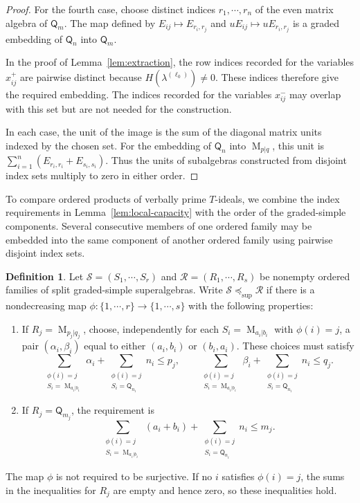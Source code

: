 \documentclass[11pt,reqno]{amsart}
\newcommand{\Mat}{\operatorname{M}}
\newcommand{\Qtype}{\mathsf Q}
\theoremstyle{definition}
\newtheorem{definition}[theorem]{Definition}
\theoremstyle{remark}
\numberwithin{equation}{section}
\begin{document}
\begin{proof}
For the fourth case, choose distinct indices
$r_1,\cdots,r_n$ of the even matrix algebra
of $\Qtype_m$. The map defined by $
E_{ij}\longmapsto E_{r_i,r_j}$ and $
uE_{ij}\longmapsto uE_{r_i,r_j}$
is a graded embedding of $\Qtype_n$
into $\Qtype_m$.

In the proof of Lemma~\ref{lem:extraction},
the row indices recorded for the variables $x^+_{ij}$
are pairwise distinct because
$H(\lambda^{(\ell_0)})\ne0$.
These indices therefore give the required embedding.
The indices recorded for the variables $x^-_{ij}$
may overlap with this set but are not needed
for the construction.

In each case, the unit of the image is the sum
of the diagonal matrix units indexed by the
chosen set.
For the embedding of $\Qtype_n$ into $\Mat_{p|q}$,
this unit is $
\sum_{i=1}^n
(E_{r_i,r_i}+E_{s_i,s_i})$.
Thus the units of subalgebras constructed from
disjoint index sets multiply to zero in either
order.
\end{proof}

To compare ordered products of verbally prime $T$-ideals,
we combine the index requirements in
Lemma~\ref{lem:local-capacity} with the order of the
graded-simple components.
Several consecutive members of one ordered family
may be embedded into the same component of another
ordered family using pairwise disjoint index sets.

\begin{definition}\label{def:super-capacity}
Let $\mathcal S=(S_1,\cdots,S_r)$ and $\mathcal R=(R_1,\cdots,R_s)$ be nonempty ordered families of split graded-simple superalgebras. Write $\mathcal S\preceq_{\mathrm{sup}}\mathcal R$ if there is a nondecreasing map $\phi:\{1,\cdots,r\}\to\{1,\cdots,s\}$ with the following properties:

\begin{enumerate}
\item
If $R_j=\Mat_{p_j|q_j}$, choose, independently for each $S_i=\Mat_{a_i|b_i}$ with $\phi(i)=j$, a pair $(\alpha_i,\beta_i)$ equal to either $(a_i,b_i)$ or $(b_i,a_i)$. These choices must satisfy
\[
\sum_{\substack{\phi(i)=j\\ S_i=\Mat_{a_i|b_i}}}\alpha_i
+\sum_{\substack{\phi(i)=j\\ S_i=\Qtype_{n_i}}}n_i\leq p_j,
\qquad
\sum_{\substack{\phi(i)=j\\ S_i=\Mat_{a_i|b_i}}}\beta_i
+\sum_{\substack{\phi(i)=j\\ S_i=\Qtype_{n_i}}}n_i\leq q_j.
\]
\item
If $R_j=\Qtype_{m_j}$, the requirement is
\[
\sum_{\substack{\phi(i)=j\\ S_i=\Mat_{a_i|b_i}}}(a_i+b_i)
+\sum_{\substack{\phi(i)=j\\ S_i=\Qtype_{n_i}}}n_i\leq m_j.
\]

\end{enumerate}
The map $\phi$ is not required to be surjective.
If no $i$ satisfies $\phi(i)=j$, the sums in the
inequalities for $R_j$ are empty and hence zero,
so these inequalities hold.

\end{definition}
\end{document}
